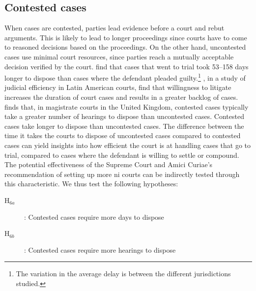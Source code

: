 \subsection{Contested cases}
\label{sec:contested_cases_meth}
When cases are contested, parties lead evidence before a court and rebut arguments. This is likely to lead to longer proceedings since courts have to come to reasoned decisions based on the proceedings. On the other hand, uncontested cases use minimal court resources, since parties reach a mutually acceptable decision verified by the court. \textcite{ostrom2000efficiency} find that cases that went to trial took 53--158 days longer to dispose than cases where the defendant pleaded guilty.\footnote{The variation in the average delay is between the different jurisdictions studied.} \textcite{buscaglia1997_latinAmericaCourtDelays}, in a study of judicial efficiency in Latin American courts, find that willingness to litigate increases the duration of court cases and results in a greater backlog of cases. \textcite{crownProsecutionService2006_magistrateCourtEfficiency} finds that, in magistrate courts in the United Kingdom, contested cases typically take a greater number of hearings to dispose than uncontested cases. Contested cases take longer to dispose than uncontested cases. The difference between the time it takes the courts to dispose of uncontested cases compared to contested cases can yield insights into how efficient the court is at handling cases that go to trial, compared to cases where the defendant is willing to settle or compound. The potential effectiveness of the Supreme Court and Amici Curiae's recommendation of setting up more \gls{ni} courts can be indirectly tested through this characteristic. We thus test the following hypotheses:

\begin{description}
\item[H$_{6a}$]: Contested cases require more days to dispose
\item[H$_{6b}$]: Contested cases require more hearings to dispose
\end{description}

